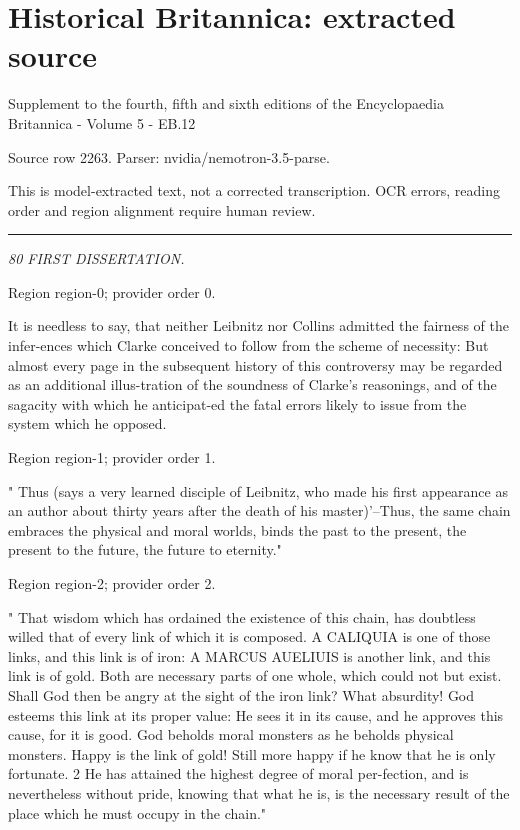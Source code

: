 \documentclass[11pt]{article}
\begin{document}
\section*{Historical Britannica: extracted source}
Supplement to the fourth, fifth and sixth editions of the Encyclopaedia Britannica - Volume 5 - EB.12\par
{\small Source row 2263. Parser: nvidia/nemotron-3.5-parse.\par}
{\small This is model-extracted text, not a corrected transcription. OCR errors, reading order and region alignment require human review.\par}
\hrule\medskip
{\small\itshape 80 FIRST DISSERTATION.\par}

{\scriptsize\color{gray} Region region-0; provider order 0.\par}
\medskip

It is needless to say, that neither Leibnitz nor Collins admitted the fairness of the infer-ences which Clarke conceived to follow from the scheme of necessity: But almost every page in the subsequent history of this controversy may be regarded as an additional illus-tration of the soundness of Clarke's reasonings, and of the sagacity with which he anticipat-ed the fatal errors likely to issue from the system which he opposed.
\par

{\scriptsize\color{gray} Region region-1; provider order 1.\par}
\medskip

" Thus (says a very learned disciple of Leibnitz, who made his first appearance as an author about thirty years after the death of his master)'--Thus, the same chain embraces the physical and moral worlds, binds the past to the present, the present to the future, the future to eternity."
\par

{\scriptsize\color{gray} Region region-2; provider order 2.\par}
\medskip

" That wisdom which has ordained the existence of this chain, has doubtless willed that of every link of which it is composed. A CALIQUIA is one of those links, and this link is of iron: A MARCUS AUELIUIS is another link, and this link is of gold. Both are necessary parts of one whole, which could not but exist. Shall God then be angry at the sight of the iron link? What absurdity! God esteems this link at its proper value: He sees it in its cause, and he approves this cause, for it is good. God beholds moral monsters as he beholds physical monsters. Happy is the link of gold! Still more happy if he know that he is only fortunate. 2 He has attained the highest degree of moral per-fection, and is nevertheless without pride, knowing that what he is, is the necessary result of the place which he must occupy in the chain."
\par
\end{document}
